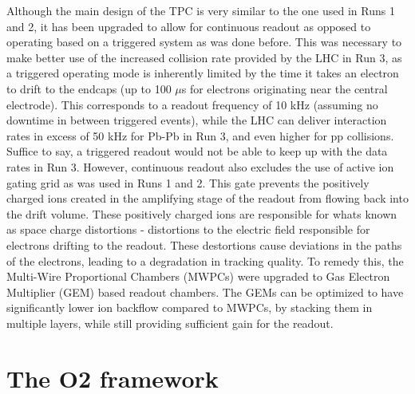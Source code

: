     Although the main design of the TPC is very similar to the one used in Runs 1 and 2, it has been upgraded to allow for continuous readout as opposed to operating based on a triggered system as was done before. This was necessary to make better use of the increased collision rate provided by the LHC in Run 3, as a triggered operating mode is inherently limited by the time it takes an electron to drift to the endcaps (up to 100 $\mu$s for electrons originating near the central electrode). This corresponds to a readout frequency of 10 kHz (assuming no downtime in between triggered events), while the LHC can deliver interaction rates in excess of 50 kHz for Pb-Pb in Run 3, and even higher for pp collisions. Suffice to say, a triggered readout would not be able to keep up with the data rates in Run 3. However, continuous readout also excludes the use of active ion gating grid as was used in Runs 1 and 2. This gate prevents the positively charged ions created in the amplifying stage of the readout from flowing back into the drift volume.  These positively charged ions are responsible for whats known as space charge distortions - distortions to the electric field responsible for electrons drifting to the readout. These destortions cause deviations in the paths of the electrons, leading to a degradation in tracking quality. 
    To remedy this, the Multi-Wire Proportional Chambers (MWPCs) were upgraded to Gas Electron Multiplier (GEM) \cite{GEM} based readout chambers. The GEMs can be optimized to have significantly lower ion backflow compared to MWPCs, by stacking them in multiple layers, while still providing sufficient gain for the readout. 


\section{The O2 framework}


